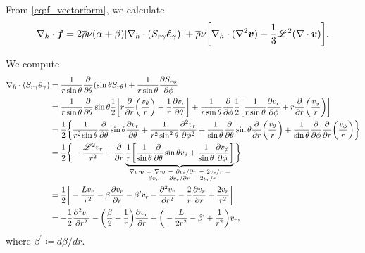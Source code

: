 \documentclass[12pt]{article} %
\newcommand{\pderiv}[2]{\frac{\partial#1}{\partial#2}}
\newcommand{\ppderiv}[2]{\frac{\partial^2#1}{\partial#2^2}}
\newcommand{\e}{\hat{\bm{e}}}
\newcommand{\rhobar}{\overline{\rho}}
\newcommand{\Div}{\nabla\cdot}
\newcommand{\divh}{\nabla_h\cdot}
\begin{document}
	From \eqref{eq:f_vectorform}, we calculate
	\begin{align}
	\divh\bm{f} = 2\rhobar\nu(\alpha+\beta)[\divh(S_{r\gamma}\e_\gamma)] + \rhobar\nu\bigg{[}\divh(\nabla^2\bm{v})+\frac{1}{3}\mathscr{L}^2(\Div\bm{v})\bigg{]}.
	\label{eq:divf_vectorform}
	\end{align}
	
	We compute
	\begin{align}
	\divh(S_{r\gamma}\e_\gamma) &= \frac{1}{r\sin\theta}\pderiv{}{\theta}(\sin\theta S_{r\theta}) + \frac{1}{r\sin\theta}\pderiv{S_{r\phi}}{\phi}\nonumber\\
	&=\frac{1}{r\sin\theta}\pderiv{}{\theta}\sin\theta\frac{1}{2}\bigg{[}r\pderiv{}{r}\bigg{(}\frac{v_\theta}{r}\bigg{)}+\frac{1}{r}\pderiv{v_r}{\theta}\bigg{]} + \frac{1}{r\sin\theta}\pderiv{}{\phi}\frac{1}{2}\bigg{[}\frac{1}{r\sin\theta}\pderiv{v_r}{\phi}+r\pderiv{}{r}\bigg{(}\frac{v_\phi}{r}\bigg{)}\bigg{]}\nonumber\\
	&= \frac{1}{2}\bigg{\{}\frac{1}{r^2\sin\theta}\pderiv{}{\theta}\sin\theta\pderiv{v_r}{\theta} + \frac{1}{r^2\sin^2\theta}\ppderiv{v_r}{\phi} +\frac{1}{\sin\theta}\pderiv{}{\theta}\sin\theta\pderiv{}{r}\bigg{(}\frac{v_\theta}{r}\bigg{)} + \frac{1}{\sin\theta}\pderiv{}{\phi}\pderiv{}{r}\bigg{(}\frac{v_\phi}{r}\bigg{)}\bigg{\}}\nonumber\\
	&= \frac{1}{2}\bigg{\{}-\frac{\mathscr{L}^2v_r}{r^2} + \pderiv{}{r}\underbrace{\frac{1}{r}\bigg{[}\frac{1}{\sin\theta}\pderiv{}{\theta}\sin\theta v_\theta + \frac{1}{\sin\theta}\pderiv{v_\phi}{\phi}\bigg{]}}_{\substack{\divh\bm{v}\ =\ \Div\bm{v}\ -\ \partial v_r/\partial r\ -\ 2v_r/r\ =\\ -\beta v_r\ -\ \partial v_r/\partial r\ -\ 2v_r/r}}\bigg{\}}\nonumber\\
	&= \frac{1}{2}\bigg{[}-\frac{Lv_r}{r^2} - \beta\pderiv{v_r}{r}-\beta^\prime v_r - \ppderiv{v_r}{r} - \frac{2}{r}\pderiv{v_r}{r}+\frac{2v_r}{r^2}\bigg{]}\nonumber\\
	&= -\frac{1}{2}\ppderiv{v_r}{r}-\bigg{(}\frac{\beta}{2}+\frac{1}{r}\bigg{)}\pderiv{v_r}{r} +\bigg{(}-\frac{L}{2r^2}-\beta^\prime+\frac{1}{r^2}\bigg{)}v_r,
	\label{eq:divhs_from_vr}
	\end{align}
	where $\beta^\prime\coloneqq d\beta/dr$.
	
\end{document}
